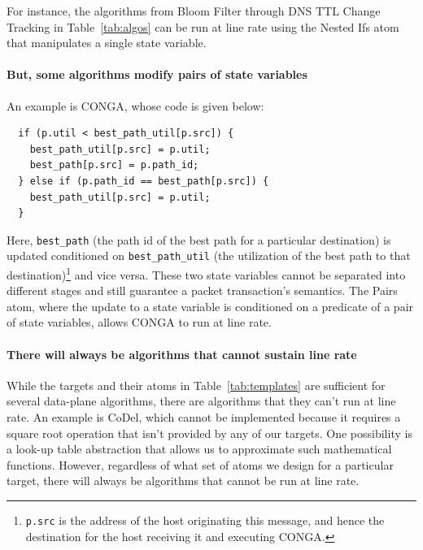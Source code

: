 For instance, the algorithms from Bloom Filter through DNS TTL Change Tracking
in Table~\ref{tab:algos} can be run at line rate using the Nested Ifs atom that
manipulates a single state variable.

\paragraph{But, some algorithms modify pairs of state variables}

An example is CONGA, whose code is given below:
\begin{verbatim}
  if (p.util < best_path_util[p.src]) {
    best_path_util[p.src] = p.util;
    best_path[p.src] = p.path_id;
  } else if (p.path_id == best_path[p.src]) {
    best_path_util[p.src] = p.util;
  }
\end{verbatim}
Here, \texttt{best\_path} (the path id of the best path for a particular
destination) is updated conditioned on \texttt{best\_path\_util} (the
utilization of the best path to that destination)\footnote{{\tt p.src} is the
  address of the host originating this message, and hence the destination for
the host receiving it and executing CONGA.} and vice versa. These two state
variables cannot be separated into different stages and still guarantee a
packet transaction's semantics. The Pairs atom, where the update to a state
variable is conditioned on a predicate of a pair of state variables, allows
CONGA to run at line rate.

\paragraph{There will always be algorithms that cannot sustain line rate}

While the targets and their atoms in Table~\ref{tab:templates} are sufficient
for several data-plane algorithms, there are algorithms that they can't run at
line rate.  An example is CoDel, which cannot be implemented because it
requires a square root operation that isn't provided by any of our targets. One
possibility is a look-up table abstraction that allows us to approximate such
mathematical functions. However, regardless of what set of atoms we design for
a particular target, there will always be algorithms that cannot be run at line
rate.



